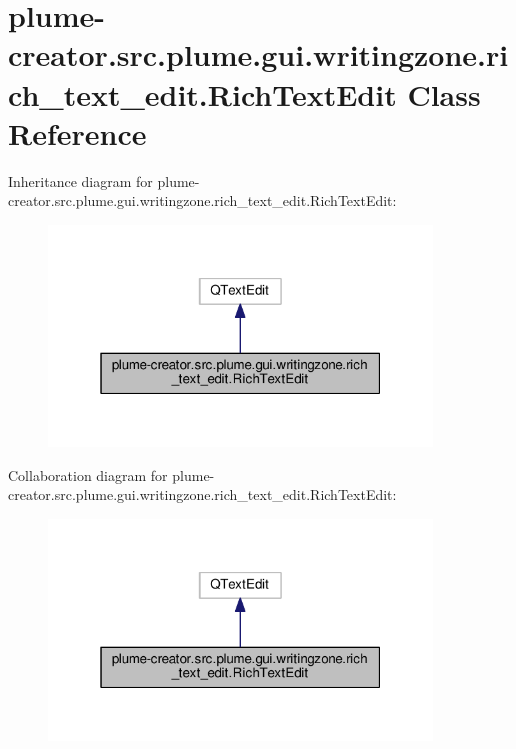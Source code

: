 \hypertarget{classplume-creator_1_1src_1_1plume_1_1gui_1_1writingzone_1_1rich__text__edit_1_1_rich_text_edit}{}\section{plume-\/creator.src.\+plume.\+gui.\+writingzone.\+rich\+\_\+text\+\_\+edit.\+Rich\+Text\+Edit Class Reference}
\label{classplume-creator_1_1src_1_1plume_1_1gui_1_1writingzone_1_1rich__text__edit_1_1_rich_text_edit}


Inheritance diagram for plume-\/creator.src.\+plume.\+gui.\+writingzone.\+rich\+\_\+text\+\_\+edit.\+Rich\+Text\+Edit\+:\nopagebreak
\begin{figure}[H]
\begin{center}
\leavevmode
\includegraphics[width=289pt]{classplume-creator_1_1src_1_1plume_1_1gui_1_1writingzone_1_1rich__text__edit_1_1_rich_text_edit__inherit__graph}
\end{center}
\end{figure}


Collaboration diagram for plume-\/creator.src.\+plume.\+gui.\+writingzone.\+rich\+\_\+text\+\_\+edit.\+Rich\+Text\+Edit\+:\nopagebreak
\begin{figure}[H]
\begin{center}
\leavevmode
\includegraphics[width=289pt]{classplume-creator_1_1src_1_1plume_1_1gui_1_1writingzone_1_1rich__text__edit_1_1_rich_text_edit__coll__graph}
\end{center}
\end{figure}
